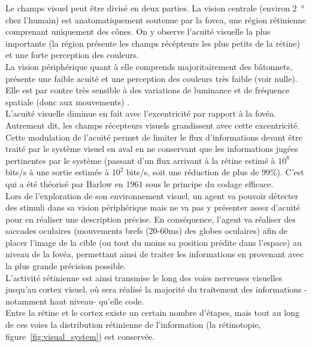Le champs visuel peut être divisé en deux parties. La vision centrale (environ \SI{2}{\degree} chez l'humain) est anatomatiquement soutenue par la fovea, une région rétinienne comprenant uniquement des cônes. On y observe l'acuité visuelle la plus importante (la région présente les champs récépteurs les plus petits de la rétine) et une forte perception des couleurs.\autocite{Werner2014}\\
La vision périphérique quant à elle comprends majoritairement des bâtonnets, présente une faible acuité et une perception des couleurs très faible (voir nulle). Elle est par contre très sensible à des variations de luminance et de fréquence spatiale (donc aux mouvements) \autocite{Werner2014}.\\
 L'acuité visuelle diminue en fait avec l'excentricité par rapport à la fovéa. Autrement dit, les champs récepteurs visuels grandissent avec cette excentricité. Cette modulation de l'acuité permet de limiter le flux d'informations devant être traité par le système visuel en aval en ne conservant que les informations jugées pertinentes par le système (passant d'un flux arrivant à la rétine estimé à $10^8$ bits/s à une sortie estimée à $10^2$ bits/s, soit une réduction de plus de 99\%). C'est qui a été théorisé par Barlow en 1961 sous le principe du codage efficace. \autocite{Kortum1996, Zhaoping2014, Werner2014, Itti2000}\\
Lors de l'exploration de son environnement visuel, un agent va pouvoir détecter des stimuli dans sa vision périphérique mais ne va pas y présenter assez d'acuité pour en réaliser une description précise.
En conséquence, l'agent va réaliser des saccades oculaires (mouvements brefs (20-60\si{\milli\second}) des globes oculaires) afin de placer l'image de la cible (ou tout du moins sa position prédite dans l'espace) au niveau de la fovéa, permettant ainsi de traiter les informations en provenant avec la plus grande précision possible.\autocite{Kortum1996, Werner2014}\\

L'activité rétinienne est ainsi transmise le long des voies nerveuses visuelles jusqu'au cortex visuel, où sera réalisé la majorité du traitement des informations -notamment haut niveau- qu'elle code.\autocite{Werner2014} \\
Entre la rétine et le cortex existe un certain nombre d'étapes, mais tout au long de ces voies la distribution rétinienne de l'information (la rétinotopie, figure~\ref{fig:visual_system}) est conservée.\autocite{Werner2014}\\

